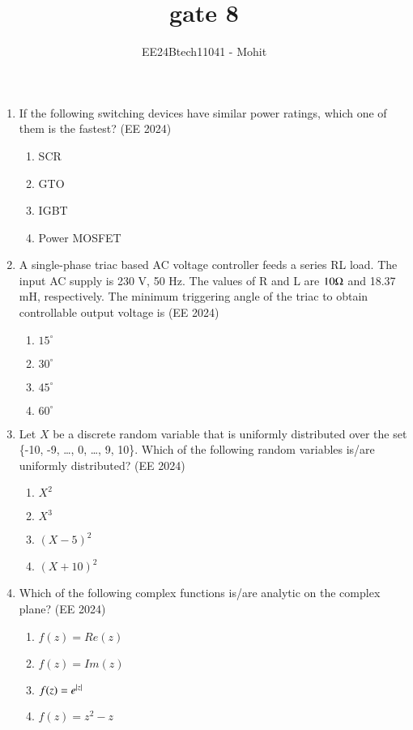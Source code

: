 \documentclass[journal,12pt,onecolumn]{IEEEtran}
\theoremstyle{remark}
\begin{document}
\title{gate 8}
\author{EE24Btech11041 - Mohit}
\maketitle
\renewcommand{\thefigure}{\theenumi}
\renewcommand{\thetable}{\theenumi}


\begin{enumerate}
\item If the following switching devices have similar power ratings, which one of them is the fastest?
\hfill{(EE 2024)}
\begin{enumerate}
\item SCR
\item GTO
\item IGBT
\item Power MOSFET
\end{enumerate}
\item  A single-phase triac based AC voltage controller feeds a series RL load. The input
AC supply is 230 V, 50 Hz. The values of R and L are $10 \ohm$ and 18.37 mH,
respectively. The minimum triggering angle of the triac to obtain controllable output
voltage is
\hfill{(EE 2024)}
\begin{enumerate}
\item $15^{\circ}$
\item $30^{\circ}$
\item $45^{\circ}$
\item $60^{\circ}$
\end{enumerate}
\item Let $X$ be a discrete random variable that is uniformly distributed over the set
\{-10, -9, \dots , 0, \dots , 9, 10\}. Which of the following random variables is/are
uniformly distributed?
\hfill{(EE 2024)}
\begin{enumerate}
\item $X^2$
\item $X^3$
\item $(X-5)^2$
\item $(X+10)^2$
\end{enumerate}
\item Which of the following complex functions is/are analytic on the complex plane?
\hfill{(EE 2024)}
\begin{enumerate}
\item $f(z)=Re(z)$
\item $f(z)=Im(z)$
\item $f(z)=e^{\left\vert z\right\vert}$
\item $f(z)=z^2-z$
\end{enumerate}

\end{enumerate}
\end{document}
